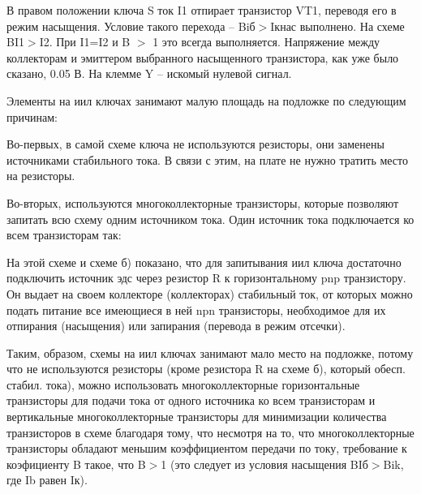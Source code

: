 В правом положении ключа S ток I1 отпирает транзистор VT1, переводя его в режим насыщения. Условие такого перехода -- Biб$>$Iкнас выполнено. На схеме BI1$>$I2. При I1=I2 и B $>$ 1 это всегда выполняется. Напряжение между коллекторам и эмиттером выбранного насыщенного транзистора, как уже было сказано, 0.05 В. На клемме Y -- искомый нулевой сигнал.

Элементы на иил ключах занимают малую площадь на подложке по следующим причинам:

Во-первых, в самой схеме ключа не используются резисторы, они заменены источниками стабильного тока. В связи с этим, на плате не нужно тратить место на резисторы. 

Во-вторых, используются многоколлекторные транзисторы, которые позволяют запитать всю схему одним источником тока. Один источник тока подключается ко всем транзисторам так:
\begin{center}
	\begin{figure}[h!]
		\caption{}	
		\label{iil5}
	\end{figure}
\end{center}



\begin{center}
	\begin{figure}[h!]
		\caption{}	
		\label{iil7}
	\end{figure}
\end{center}
На этой схеме и схеме б) показано, что для запитывания иил ключа достаточно подключить источник эдс через резистор R к горизонтальному pnp транзистору. Он выдает на своем коллекторе (коллекторах) стабильный ток, от которых можно подать питание все имеющиеся в ней npn транзисторы, необходимое для их отпирания (насыщения) или запирания (перевода в режим отсечки).

Таким, образом, схемы на иил ключах занимают мало место на подложке, потому что не используются резисторы (кроме резистора R на схеме б), который обесп. стабил. тока), можно использовать многоколлекторные горизонтальные транзисторы для подачи тока от одного источника ко всем транзисторам и вертикальные многоколлекторные транзисторы для минимизации количества транзисторов в схеме благодаря тому, что несмотря на то, что многоколлекторные транзисторы обладают меньшим коэффициентом передачи по току, требование к коэфициенту B такое, что B$>$1 (это следует из условия насыщения BIб$>$Bik, где Ib равен Iк).
